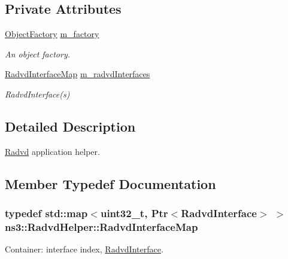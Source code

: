 \subsection*{Private Attributes}
\begin{DoxyCompactItemize}
\item 
\hyperlink{classns3_1_1ObjectFactory}{Object\+Factory} \hyperlink{classns3_1_1RadvdHelper_a3be43d0114cbbc58e581f621d2f77e35}{m\+\_\+factory}
\begin{DoxyCompactList}\small\item\em An object factory. \end{DoxyCompactList}\item 
\hyperlink{classns3_1_1RadvdHelper_a8d968efa50941c7c0076046568ca5592}{Radvd\+Interface\+Map} \hyperlink{classns3_1_1RadvdHelper_a90792a45cd3b20d6eb1f4bc0b4dd20ba}{m\+\_\+radvd\+Interfaces}
\begin{DoxyCompactList}\small\item\em Radvd\+Interface(s) \end{DoxyCompactList}\end{DoxyCompactItemize}


\subsection{Detailed Description}
\hyperlink{classns3_1_1Radvd}{Radvd} application helper. 

\subsection{Member Typedef Documentation}
\subsubsection[{\texorpdfstring{Radvd\+Interface\+Map}{RadvdInterfaceMap}}]{\setlength{\rightskip}{0pt plus 5cm}typedef std\+::map$<$uint32\+\_\+t, {\bf Ptr}$<${\bf Radvd\+Interface}$>$ $>$ {\bf ns3\+::\+Radvd\+Helper\+::\+Radvd\+Interface\+Map}\hspace{0.3cm}{\ttfamily [private]}}\hypertarget{classns3_1_1RadvdHelper_a8d968efa50941c7c0076046568ca5592}{}\label{classns3_1_1RadvdHelper_a8d968efa50941c7c0076046568ca5592}


Container\+: interface index, \hyperlink{classns3_1_1RadvdInterface}{Radvd\+Interface}. 

